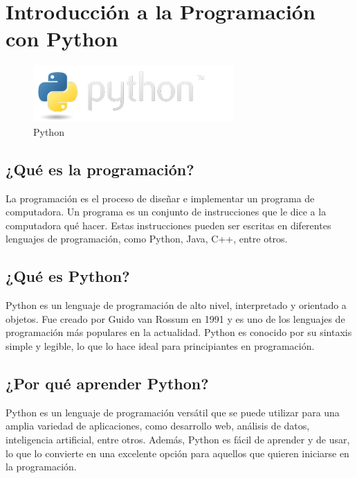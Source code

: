 \documentclass[
  a4paper,
  DIV=11,
  numbers=noendperiod,
  onepage,
  openany]{scrreprt}
\begin{document}
\chapter{Introducción a la Programación con
Python}\label{introducciuxf3n-a-la-programaciuxf3n-con-python}

\begin{figure}[H]

{\centering \includegraphics{index_files/mediabag/python-logo.png}

}

\caption{Python}

\end{figure}%

\section{¿Qué es la programación?}\label{quuxe9-es-la-programaciuxf3n}

La programación es el proceso de diseñar e implementar un programa de
computadora. Un programa es un conjunto de instrucciones que le dice a
la computadora qué hacer. Estas instrucciones pueden ser escritas en
diferentes lenguajes de programación, como Python, Java, C++, entre
otros.

\section{¿Qué es Python?}\label{quuxe9-es-python}

Python es un lenguaje de programación de alto nivel, interpretado y
orientado a objetos. Fue creado por Guido van Rossum en 1991 y es uno de
los lenguajes de programación más populares en la actualidad. Python es
conocido por su sintaxis simple y legible, lo que lo hace ideal para
principiantes en programación.

\section{¿Por qué aprender Python?}\label{por-quuxe9-aprender-python}

Python es un lenguaje de programación versátil que se puede utilizar
para una amplia variedad de aplicaciones, como desarrollo web, análisis
de datos, inteligencia artificial, entre otros. Además, Python es fácil
de aprender y de usar, lo que lo convierte en una excelente opción para
aquellos que quieren iniciarse en la programación.
\end{document}
